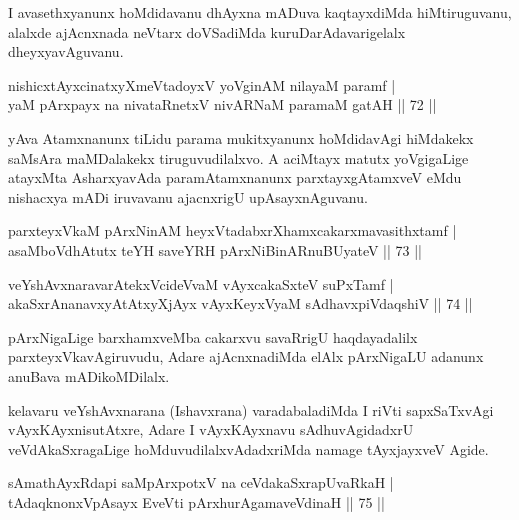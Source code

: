\begin{artha}
I avasethxyanunx hoMdidavanu dhAyxna mADuva kaqtayxdiMda hiMtiruguvanu, alalxde ajAcnxnada neVtarx doVSadiMda kuruDarAdavarigelalx dheyxyavAguvanu.
\end{artha}


\begin{shl}
nishicxtAyxcinatxyXmeVtadoyxV yoVginAM nilayaM paramf |\\
yaM pArxpayx na nivataRnetxV nivARNaM paramaM gatAH \hfill || 72 ||
\end{shl}

\begin{artha}
yAva Atamxnanunx tiLidu parama mukitxyanunx hoMdidavAgi hiMdakekx saMsAra maMDalakekx tiruguvudilalxvo. A aciMtayx matutx yoVgigaLige atayxMta AsharxyavAda paramAtamxnanunx parxtayxgAtamxveV eMdu nishacxya mADi iruvavanu ajacnxrigU upAsayxnAguvanu.
\end{artha}


\begin{shl}
parxteyxVkaM pArxNinAM heyxVtadabxrXhamxcakarxmavasithxtamf |\\
asaMboVdhAtutx teYH saveYRH pArxNiBinARnuBUyateV \hfill || 73 ||
\end{shl}
\begin{shl}
veYshAvxnaravarAtekxVcideVvaM vAyxcakaSxteV suPxTamf |\\
akaSxrAnanavxyAtAtxyXjAyx vAyxKeyxVyaM sAdhavxpiVdaqshiV \hfill || 74 ||
\end{shl}

\begin{artha}
pArxNigaLige barxhamxveMba cakarxvu savaRrigU haqdayadalilx parxteyxVkavAgiruvudu, Adare ajAcnxnadiMda elAlx pArxNigaLU adanunx anuBava mADikoMDilalx.
\end{artha}

\begin{artha}
kelavaru veYshAvxnarana (Ishavxrana) varadabaladiMda I riVti sapxSaTxvAgi vAyxKAyxnisutAtxre, Adare I vAyxKAyxnavu sAdhuvAgidadxrU veVdAkaSxragaLige hoMduvudilalxvAdadxriMda namage tAyxjayxveV Agide.
\end{artha}


\begin{shl}
sAmathAyxRdapi saMpArxpotxV na ceVdakaSxrapUvaRkaH |\\
tAdaqknonxVpAsayx EveVti pArxhurAgamaveVdinaH \hfill || 75 ||
\end{shl}

